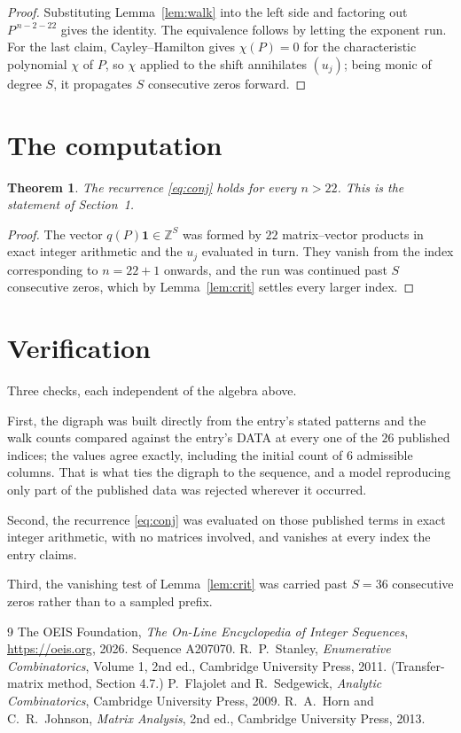 \documentclass[11pt,a4paper]{article}
\theoremstyle{plain}
\newtheorem{theorem}{Theorem}
\theoremstyle{definition}
\begin{document}
\begin{proof}
Substituting Lemma~\ref{lem:walk} into the left side and factoring out
$P^{\,n-2-22}$ gives the identity. The equivalence follows by letting the exponent
run. For the last claim, Cayley--Hamilton gives $\chi(P)=0$ for the characteristic
polynomial $\chi$ of $P$, so $\chi$ applied to the shift annihilates $(u_j)$; being monic of
degree $S$, it propagates $S$ consecutive zeros forward.
\end{proof}

\section{The computation}

\begin{theorem}
The recurrence \eqref{eq:conj} holds for every $n>22$. This is the statement of
Section~1.
\end{theorem}

\begin{proof}
The vector $q(P)\mathbf{1}\in\mathbb{Z}^{S}$ was formed by $22$ matrix--vector
products in exact integer arithmetic and the $u_j$ evaluated in turn. They vanish from the
index corresponding to $n=22+1$ onwards, and the run was continued past $S$ consecutive
zeros, which by Lemma~\ref{lem:crit} settles every larger index.
\end{proof}

\section{Verification}

Three checks, each independent of the algebra above.

First, the digraph was built directly from the entry's stated patterns and the walk counts
compared against the entry's DATA at every one of the $26$ published indices; the
values agree exactly, including the initial count of $6$ admissible columns. That is
what ties the digraph to the sequence, and a model reproducing only part of the published
data was rejected wherever it occurred.

Second, the recurrence \eqref{eq:conj} was evaluated on those published terms in exact
integer arithmetic, with no matrices involved, and vanishes at every index the entry claims.

Third, the vanishing test of Lemma~\ref{lem:crit} was carried past $S=36$ consecutive
zeros rather than to a sampled prefix.

\begin{thebibliography}{9}
 The OEIS Foundation, \emph{The On-Line Encyclopedia of Integer
Sequences}, \url{https://oeis.org}, 2026. Sequence A207070.
 R.~P.~Stanley, \emph{Enumerative Combinatorics}, Volume 1, 2nd ed.,
Cambridge University Press, 2011. (Transfer-matrix method, Section 4.7.)
 P.~Flajolet and R.~Sedgewick, \emph{Analytic Combinatorics}, Cambridge
University Press, 2009.
 R.~A.~Horn and C.~R.~Johnson, \emph{Matrix Analysis}, 2nd ed., Cambridge
University Press, 2013.
\end{thebibliography}
\end{document}
